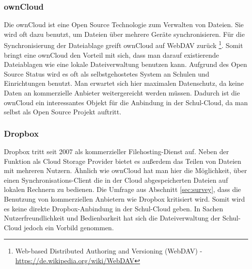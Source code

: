 \subsubsection{ownCloud}

Die ownCloud ist eine Open Source Technologie zum Verwalten von Dateien. Sie wird oft dazu benutzt, um Dateien über mehrere Geräte synchronisieren. Für die Synchronisierung der Dateiablage greift ownCloud auf WebDAV zurück \footnote{Web-based Distributed Authoring and Versioning (WebDAV) - \url{https://de.wikipedia.org/wiki/WebDAV}}. Somit bringt eine ownCloud den Vorteil mit sich, dass man darauf existierende Dateiablagen wie eine lokale Dateiverwaltung benutzen kann. Aufgrund des Open Source Status wird es oft als selbstgehostetes System an Schulen und Einrichtungen benutzt. Man erwartet sich hier maximalen Datenschutz, da keine Daten an kommerzielle Anbieter weitergereicht werden müssen. Dadurch ist die ownCloud ein interessantes Objekt für die Anbindung in der Schul-Cloud, da man selbst als Open Source Projekt auftritt.

\subsubsection{Dropbox}

Dropbox tritt seit 2007 als kommerzieller Filehosting-Dienst auf. Neben der Funktion als Cloud Storage Provider bietet es außerdem das Teilen von Dateien mit mehreren Nutzern. Ähnlich wie ownCloud hat man hier die Möglichkeit, über einen Synchronisations-Client die in der Cloud abgespeicherten Dateien auf lokalen Rechnern zu bedienen. Die Umfrage aus Abschnitt \ref{sec:survey}, dass die Benutzung von kommerziellen Anbietern wie Dropbox kritisiert wird. Somit wird es keine direkte Dropbox-Anbindung in der Schul-Cloud geben. In Sachen Nutzerfreundlichkeit und Bedienbarkeit hat sich die Dateiverwaltung der Schul-Cloud jedoch ein Vorbild genommen. 

\clearpage
